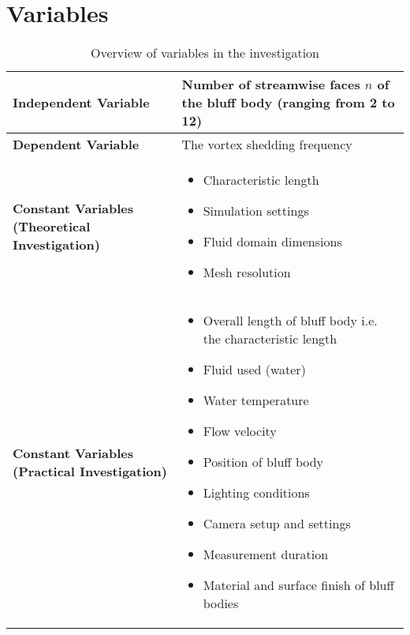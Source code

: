 \section{Variables}

\begin{table}[H]
	\centering
	\renewcommand{\arraystretch}{1.3}
	\begin{tabularx}{\textwidth}{|>{\raggedright\arraybackslash}p{5.2cm}|X|}
		\hline
		\textbf{Independent Variable} & Number of streamwise faces $n$ of the bluff body (ranging from 2 to 12) \\
		\hline
		\textbf{Dependent Variable} & The vortex shedding frequency \\
		\hline
		\textbf{Constant Variables (Theoretical Investigation)} &
		\begin{itemize}[leftmargin=1.5em, itemsep=2pt, topsep=0pt, label=--]
			\item Characteristic length
			\item Simulation settings
			\item Fluid domain dimensions
			\item Mesh resolution
		\end{itemize} \\
		\hline
		\textbf{Constant Variables (Practical Investigation)} &
		\begin{itemize}[leftmargin=1.5em, itemsep=2pt, topsep=0pt, label=--]
			\item Overall length of bluff body i.e. the characteristic length
			\item Fluid used (water)
			\item Water temperature
			\item Flow velocity
			\item Position of bluff body
			\item Lighting conditions
			\item Camera setup and settings
			\item Measurement duration
			\item Material and surface finish of bluff bodies
		\end{itemize} \\
		\hline
	\end{tabularx}
	\caption{Overview of variables in the investigation}
	\label{tab:variables}
\end{table}

